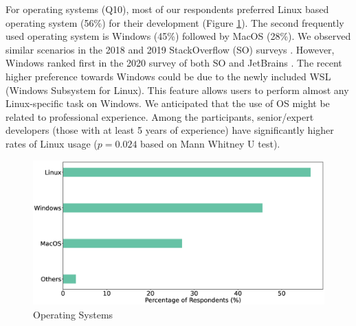 
For operating systems (Q10), most of our
respondents preferred Linux based operating system (56\%) for their development (Figure \ref{fig:os}). The second frequently used
operating system is Windows (45\%) followed by MacOS (28\%). We
observed similar scenarios in the 2018 and 2019 StackOverflow (SO) surveys
\cite{StackoverflowSurvey2018,StackoverflowSurvey2019}. However, Windows ranked
first in the 2020 survey of both SO and JetBrains \cite{StackoverflowSurvey2020,
JetBrains2020}. The recent higher preference towards Windows could be due to the newly
included WSL (Windows Subsystem for Linux). This feature allows users to perform
almost any Linux-specific task on Windows. We anticipated that the use of OS
might be related to professional experience. Among the participants,
senior/expert developers (those with at least 5 years of experience) have significantly higher rates of Linux usage ($p=0.024$ based on Mann Whitney U test). 
\begin{figure}[h]
\centering
  \includegraphics[scale=0.17]{Figures/Respondents_os}
  \caption{Operating Systems}
  \label{fig:os}
\end{figure}

